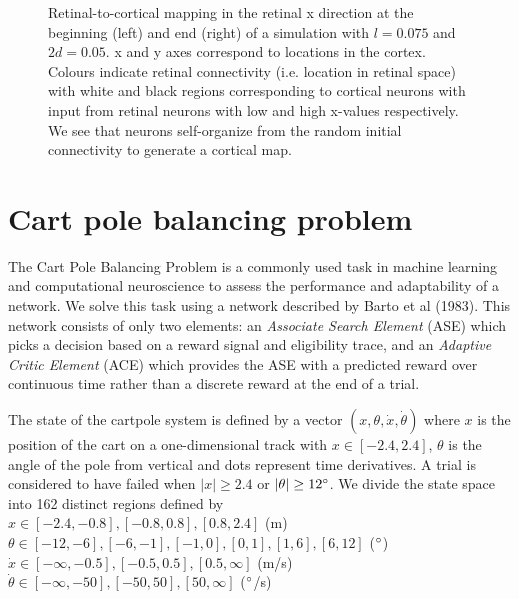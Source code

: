 \documentclass{article}
\begin{document}
\begin{figure}[h]
\begin{subfigure}[t]{0.20\linewidth}
	\end{subfigure}%
\caption{Retinal-to-cortical mapping in the retinal x direction at the beginning (left) and end (right) of a simulation with $l = 0.075$ and $2d = 0.05$. x and y axes correspond to locations in the cortex. Colours indicate retinal connectivity (i.e. location in retinal space) with white and black regions corresponding to cortical neurons with input from retinal neurons with low and high x-values respectively. We see that neurons self-organize from the random initial connectivity to generate a cortical map.}
\label{fig:xs_075}
\end{figure}




\section{Cart pole balancing problem}

The Cart Pole Balancing Problem is a commonly used task in machine learning and computational neuroscience to assess the performance and adaptability of a network. We solve this task using a network described by Barto et al (1983). This network consists of only two elements: an
\textit{Associate Search Element} (ASE) which picks a decision based on a reward signal and eligibility trace, and an
\textit{Adaptive Critic Element} (ACE) which provides the ASE with a predicted reward over continuous time rather than a discrete reward at the end of a trial.

The state of the cartpole system is defined by a vector $(x, \theta, \dot x, \dot \theta)$ where $x$ is the position of the cart on a one-dimensional track with $x \in [-2.4, 2.4]$,
$\theta$ is the angle of the pole from vertical and dots represent time derivatives. A trial is considered to have failed when $|x| \geq 2.4$ or $| \theta | \geq 12 \degree$.
We divide the state space into 162 distinct regions defined by\\
$x \in [-2.4,-0.8], [-0.8,0.8],[0.8,2.4]$ (m)\\
$\theta \in [-12,-6],[-6,-1],[-1,0],[0,1],[1,6],[6,12]$ ($\degree$)\\
$\dot x \in [-\infty,-0.5],[-0.5,0.5],[0.5,\infty]$ (m/s)\\
$\dot \theta \in [-\infty,-50],[-50,50],[50,\infty]$ ($\degree$/s)
\end{document}

